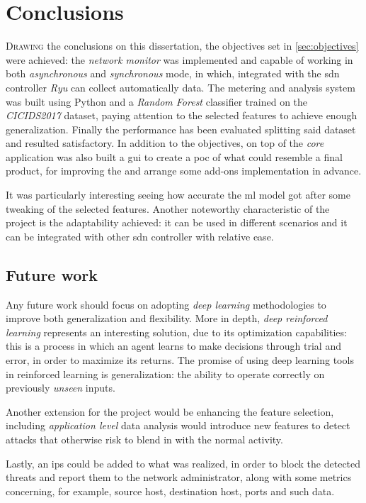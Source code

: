 \chapter{Conclusions}
\label{chap:conclusions}

\lettrine[lines=4, findent=3pt, nindent=0pt]{D}{rawing} the conclusions on this dissertation, the objectives set in \ref{sec:objectives} were achieved: the \textit{network monitor} was implemented and capable of working in both \textit{asynchronous} and \textit{synchronous} mode, in which, integrated with the \gls{sdn} controller \textit{Ryu} can collect automatically data. The metering and analysis system was built using Python and a \textit{Random Forest} classifier trained on the \textit{CICIDS2017} dataset, paying attention to the selected features to achieve enough generalization. Finally the performance has been evaluated splitting said dataset and resulted satisfactory. In addition to the objectives, on top of the \textit{core} application was also built a \gls{gui} to create a \gls{poc} of what could resemble a final product, for improving the  and arrange some add-ons implementation in advance.
\par It was particularly interesting seeing how accurate the \gls{ml} model got after some tweaking of the selected features. Another noteworthy characteristic of the project is the adaptability achieved: it can be used in different scenarios and it can be integrated with other \gls{sdn} controller with relative ease.

\section{Future work}
\label{sec:future-work}

Any future work should focus on adopting \textit{deep learning} methodologies to improve both generalization and flexibility. More in depth, \textit{deep reinforced learning} represents an interesting solution, due to its optimization capabilities: this is a process in which an agent learns to make decisions through trial and error, in order to maximize its returns. The promise of using deep learning tools in reinforced learning is generalization:  the ability to operate correctly on previously \textit{unseen} inputs.
\par Another extension for the project would be enhancing the feature selection, including \textit{application level} data analysis would introduce new features to detect attacks that otherwise risk to blend in with the normal activity.
\par Lastly, an \gls{ips} could be added to what was realized, in order to block the detected threats and report them to the network administrator, along with some metrics concerning, for example, source host, destination host, ports and such data.

